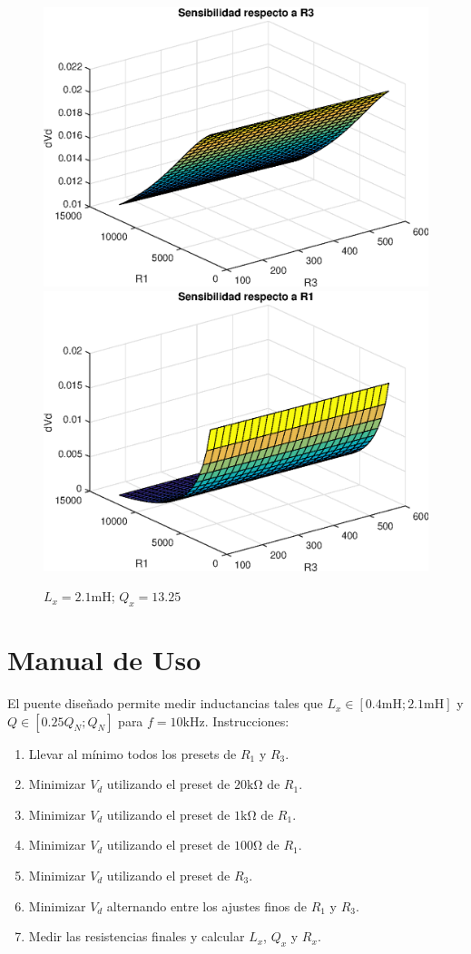     \begin{figure}[ht!]
        \begin{center}
            \includegraphics[width=0.4\linewidth]{MATLAB/ej3dVd3max}
            \includegraphics[width=0.4\linewidth]{MATLAB/ej3dVd1max}
            \caption{$L_x=2.1\si{\milli\henry}$; $Q_x=13.25$}
            \label{fig:ej3dVd:max}
        \end{center}
    \end{figure}

    \newpage
    \section{Manual de Uso}
    El puente diseñado permite medir inductancias tales que $L_x\in[0.4\si{\milli\henry};
    2.1\si{\milli\henry}]$ y $Q\in[0.25Q_N; Q_N]$ para $f=10\si{\kilo\hertz}$. 
    Instrucciones:
    \begin{enumerate}
        \item Llevar al mínimo todos los presets de $R_1$ y $R_3$.
        \item Minimizar $V_d$ utilizando el preset de $20\si{\kilo\ohm}$ de $R_1$.
        \item Minimizar $V_d$ utilizando el preset de $1\si{\kilo\ohm}$ de $R_1$.
        \item Minimizar $V_d$ utilizando el preset de $100\si{\ohm}$ de $R_1$.
        \item Minimizar $V_d$ utilizando el preset de $R_3$.
        \item Minimizar $V_d$ alternando entre los ajustes finos de $R_1$ y $R_3$.
        \item Medir las resistencias finales y calcular $L_x$, $Q_x$ y $R_x$.
    \end{enumerate}

